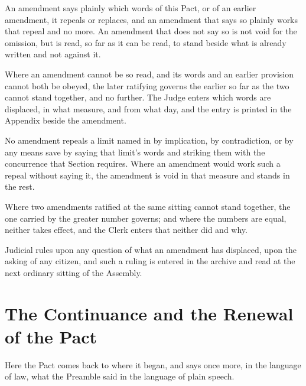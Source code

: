 \begin{clauses}
\item An amendment says plainly which words of this Pact, or of an earlier amendment, it repeals or replaces, and an amendment that says so plainly works that repeal and no more. An amendment that does not say so is not void for the omission, but is read, so far as it can be read, to stand beside what is already written and not against it.
\item Where an amendment cannot be so read, and its words and an earlier provision cannot both be obeyed, the later ratifying governs the earlier so far as the two cannot stand together, and no further. The Judge enters which words are displaced, in what measure, and from what day, and the entry is printed in the Appendix beside the amendment.
\item No amendment repeals a limit named in  by implication, by contradiction, or by any means save by saying that limit's words and striking them with the concurrence that Section requires. Where an amendment would work such a repeal without saying it, the amendment is void in that measure and stands in the rest.
\item Where two amendments ratified at the same sitting cannot stand together, the one carried by the greater number governs; and where the numbers are equal, neither takes effect, and the Clerk enters that neither did and why.
\item Judicial rules upon any question of what an amendment has displaced, upon the asking of any citizen, and such a ruling is entered in the archive and read at the next ordinary sitting of the Assembly.
\end{clauses}

\section{The Continuance and the Renewal of the Pact}
\label{sec:amendment:continuance-and-the-renewal-of-the-pact}

Here the Pact comes back to where it began, and says once more, in the language of law, what the Preamble said in the language of plain speech.

